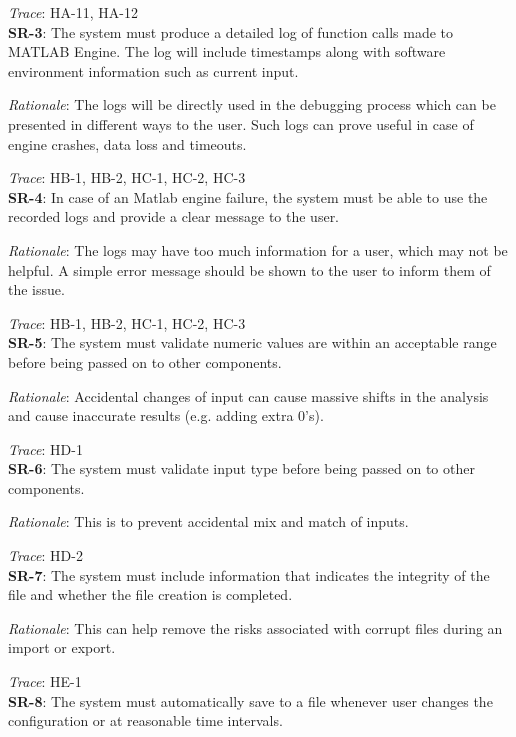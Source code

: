 \documentclass{article}
\begin{document}
\emph{Trace}: HA-11, HA-12 \\

\textbf{SR-3}: 
The system must produce a detailed log of function calls made to MATLAB Engine. The log will include timestamps along 
with software environment information such as current input.

\emph{Rationale}:
The logs will be directly used in the debugging process which can be presented in different ways to the user. Such logs 
can prove useful in case of engine crashes, data loss and timeouts.

\emph{Trace}: HB-1, HB-2, HC-1, HC-2, HC-3\\

\textbf{SR-4}:
In case of an Matlab engine failure, the system must be able to use the recorded logs and provide a clear message to 
the user.

\emph{Rationale}: The logs may have too much information for a user, which may not be helpful. A simple error message
should be shown to the user to inform them of the issue.

\emph{Trace}: HB-1, HB-2, HC-1, HC-2, HC-3\\

\textbf{SR-5}:
The system must validate numeric values are within an acceptable range before being passed on to other components.

\emph{Rationale}: Accidental changes of input can cause massive shifts in the analysis and cause inaccurate results 
(e.g. adding extra 0’s).

\emph{Trace}: HD-1 \\

\textbf{SR-6}:
The system must validate input type before being passed on to other components.

\emph{Rationale}: This is to prevent accidental mix and match of inputs.

\emph{Trace}: HD-2\\

\textbf{SR-7}:
The system must include information that indicates the integrity of the file and whether the file creation is completed.

\emph{Rationale}: This can help remove the risks associated with corrupt files during an import or export. 

\emph{Trace}: HE-1\\

\textbf{SR-8}:
The system must automatically save to a file whenever user changes the configuration or at reasonable time intervals.
\end{document}
